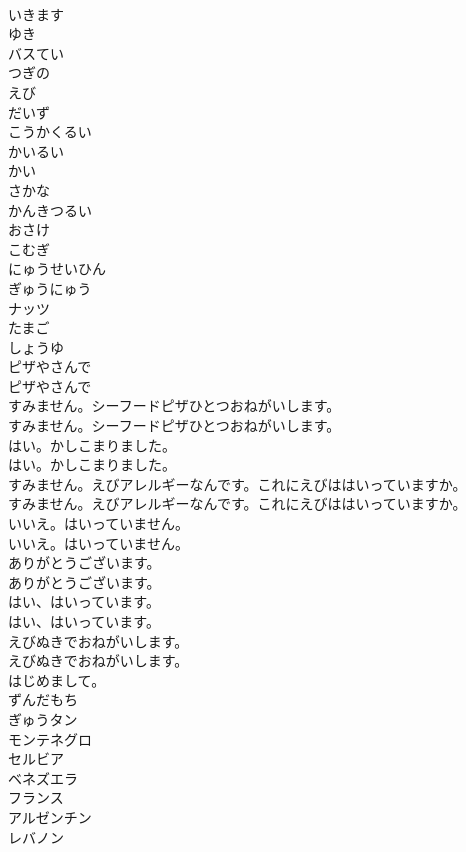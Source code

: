 \documentclass[8pt]{extreport}
\begin{document}
\begin{CJK}{UTF8}{min}
\\	いきます
\\	ゆき
\\	バスてい
\\	つぎの
\\	えび
\\	だいず
\\	こうかくるい
\\	かいるい
\\	かい
\\	さかな
\\	かんきつるい
\\	おさけ
\\	こむぎ
\\	にゅうせいひん
\\	ぎゅうにゅう
\\	ナッツ
\\	たまご
\\	しょうゆ
\\	ピザやさんで	
\\	ピザやさんで 
\\	すみません。シーフードピザひとつおねがいします。	
\\	すみません。シーフードピザひとつおねがいします。 
\\	はい。かしこまりました。	
\\	はい。かしこまりました。 
\\	すみません。えびアレルギーなんです。これにえびははいっていますか。	
\\	すみません。えびアレルギーなんです。これにえびははいっていますか。 
\\	いいえ。はいっていません。	
\\	いいえ。はいっていません。 
\\	ありがとうございます。	
\\	ありがとうございます。 
\\	はい、はいっています。	
\\	はい、はいっています。 
\\	えびぬきでおねがいします。	
\\	えびぬきでおねがいします。 
\\	はじめまして。
\\	ずんだもち
\\	ぎゅうタン
\\	モンテネグロ
\\	セルビア
\\	ベネズエラ
\\	フランス
\\	アルゼンチン
\\	レバノン

\end{CJK}
\end{document}
